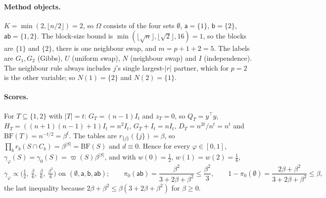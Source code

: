 \documentclass[11pt]{article}
\theoremstyle{definition}
\newcommand{\Om}{\Omega}
\newcommand{\BF}{\mathrm{BF}}
\newcommand{\ph}{\varphi}
\newcommand{\vp}{\varpi}
\newcommand{\sa}{\mathsf a}
\newcommand{\sbb}{\mathsf b}
\newcommand{\sab}{\mathsf{ab}}
\begin{document}
\paragraph{Method objects.} $K=\min(2,\lfloor n/2\rfloor)=2$, so $\Om$ consists of the four sets $\emptyset$, $\sa=\{1\}$, $\sbb=\{2\}$, $\sab=\{1,2\}$. The block-size bound is $\min(\lfloor\sqrt n\rfloor,\lfloor\sqrt2\rfloor,16)=1$, so the blocks are $\{1\}$ and $\{2\}$, there is one neighbour swap, and $m=p+1+2=5$. The labels are $G_1,G_2$ (Gibbs), $U$ (uniform swap), $N$ (neighbour swap) and $I$ (independence). The neighbour rule always includes $j$'s single largest-$|r|$ partner, which for $p=2$ is the other variable; so $N(1)=\{2\}$ and $N(2)=\{1\}$.

\paragraph{Scores.} For $T\subseteq\{1,2\}$ with $|T|=t$: $G_T=(n-1)I_t$ and $z_T=0$, so $Q_T=y^\top y$, $H_T=((n+1)(n-1)+1)I_t=n^2I_t$, $G_T+I_t=nI_t$, $D_T=n^{2t}/n^t=n^t$ and $\BF(T)=n^{-t/2}=\beta^t$. The tables are $r_{\{j\}}(\{j\})=\beta$, so $\prod_br_b(S\cap C_b)=\beta^{|S|}=\BF(S)$ and $d\equiv0$. Hence for every $\ph\in[0,1]$, $\gamma_\ph(S)=\gamma_0(S)=\vp(S)\beta^{|S|}$, and with $w(0)=\frac12$, $w(1)=w(2)=\frac16$,
\[
\gamma_\ph\propto\Big(\tfrac12,\ \tfrac\beta6,\ \tfrac\beta6,\ \tfrac{\beta^2}6\Big)\text{ on }(\emptyset,\sa,\sbb,\sab);\qquad
\pi_0(\sab)=\frac{\beta^2}{3+2\beta+\beta^2}\le\frac{\beta^2}3,\qquad 1-\pi_0(\emptyset)=\frac{2\beta+\beta^2}{3+2\beta+\beta^2}\le\beta,
\]
the last inequality because $2\beta+\beta^2\le\beta(3+2\beta+\beta^2)$ for $\beta\ge0$.
\end{document}
